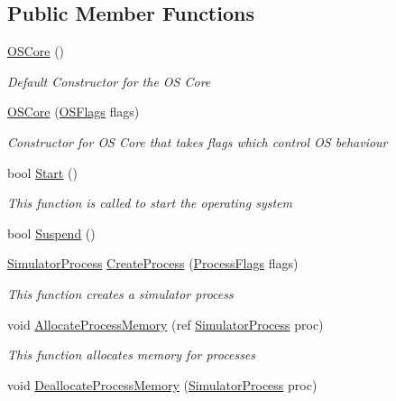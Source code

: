 \subsection*{Public Member Functions}
\begin{DoxyCompactItemize}
\item 
\hyperlink{class_c_p_u___o_s___simulator_1_1_operating___system_1_1_o_s_core_a3845ed83851b87e64d6918a2a495e45e}{O\+S\+Core} ()
\begin{DoxyCompactList}\small\item\em Default Constructor for the O\+S Core \end{DoxyCompactList}\item 
\hyperlink{class_c_p_u___o_s___simulator_1_1_operating___system_1_1_o_s_core_a65c809ada2e4d0d5f6269e6a9009db0d}{O\+S\+Core} (\hyperlink{struct_c_p_u___o_s___simulator_1_1_operating___system_1_1_o_s_flags}{O\+S\+Flags} flags)
\begin{DoxyCompactList}\small\item\em Constructor for O\+S Core that takes flags which control O\+S behaviour \end{DoxyCompactList}\item 
bool \hyperlink{class_c_p_u___o_s___simulator_1_1_operating___system_1_1_o_s_core_adb8186aefcc47d02daa0856e5c9c42b7}{Start} ()
\begin{DoxyCompactList}\small\item\em This function is called to start the operating system \end{DoxyCompactList}\item 
bool \hyperlink{class_c_p_u___o_s___simulator_1_1_operating___system_1_1_o_s_core_a002e939ae562ef2797f692bdf4eae3cd}{Suspend} ()
\item 
\hyperlink{class_c_p_u___o_s___simulator_1_1_operating___system_1_1_simulator_process}{Simulator\+Process} \hyperlink{class_c_p_u___o_s___simulator_1_1_operating___system_1_1_o_s_core_afee9dd12629e415c420fc7c197f784c4}{Create\+Process} (\hyperlink{struct_c_p_u___o_s___simulator_1_1_operating___system_1_1_process_flags}{Process\+Flags} flags)
\begin{DoxyCompactList}\small\item\em This function creates a simulator process \end{DoxyCompactList}\item 
void \hyperlink{class_c_p_u___o_s___simulator_1_1_operating___system_1_1_o_s_core_aaca3eba12c3f4e774d0328e3d3402ae3}{Allocate\+Process\+Memory} (ref \hyperlink{class_c_p_u___o_s___simulator_1_1_operating___system_1_1_simulator_process}{Simulator\+Process} proc)
\begin{DoxyCompactList}\small\item\em This function allocates memory for processes \end{DoxyCompactList}\item 
void \hyperlink{class_c_p_u___o_s___simulator_1_1_operating___system_1_1_o_s_core_a4aae3fddd5cbcc89e447f487b55301ac}{Deallocate\+Process\+Memory} (\hyperlink{class_c_p_u___o_s___simulator_1_1_operating___system_1_1_simulator_process}{Simulator\+Process} proc)
\end{DoxyCompactItemize}
